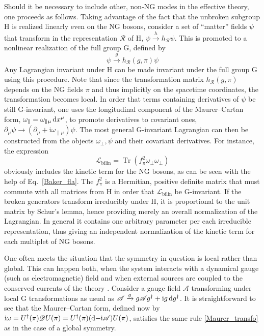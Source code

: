 \documentclass[final,2p,times,12pt,sort&compress]{elsarticle}
\newcommand\gr[1]{\mathrm{#1}}              %
\newcommand\Lag{\mathscr{L}}                %
\newcommand\DD{\mathscr{D}}                 %
\newcommand\RR{\mathscr{R}}                 %
\newcommand\AAA{\mathscr{A}}                %
\newcommand\he[1]{#1^{\dagger}}             %
\newcommand\imag{\mathrm i}                 %
\newcommand\de{\partial}
\newcommand\dd{\mathop{{\rm d}\!}\nolimits} %
\DeclareMathOperator{\Tr}{Tr}
\begin{document}
Should it be necessary to include other, non-NG modes in the effective theory,
one proceeds as follows. Taking advantage of the fact that the unbroken
subgroup $\gr H$ is realized linearly even on the NG bosons, consider a set of
``matter'' fields $\psi$ that transform in the representation $\RR$ of $\gr H$,
$\psi\xrightarrow{h}h_\RR\psi$. This is promoted to a nonlinear realization of
the full group $\gr G$, defined by
\begin{equation}
\psi\xrightarrow{g}h_\RR(g,\pi)\psi
\end{equation}
Any Lagrangian invariant under $\gr H$ can be made invariant under the full
group $\gr G$ using this procedure. Note that since the transformation matrix
$h_\RR(g,\pi)$ depends on the NG fields $\pi$ and thus implicitly on the
spacetime coordinates, the transformation becomes local. In order that terms
containing derivatives of $\psi$ be still $\gr G$-invariant, one uses the
longitudinal component of the Maurer--Cartan form,
$\omega_\parallel=\omega_{\parallel\mu}\dd x^\mu$, to promote derivatives to
covariant ones, $\de_\mu\psi\to(\de_\mu+\imag\omega_{\parallel\mu})\psi$. The
most general $\gr G$-invariant Lagrangian can then be constructed
\cite{Burgess:1998ku} from the objects $\omega_\perp,\psi$ and their covariant
derivatives. For instance, the expression
\begin{equation}
\Lag_{\text{bilin}}=\Tr(f_\pi^2\omega_\perp\omega_\perp)
\label{coset_kinterm}
\end{equation}
obviously includes the kinetic term for the NG bosons, as can be seen with the
help of Eq.~\eqref{Baker_fla}. The $f_\pi^2$ is a Hermitian, positive definite
matrix that must commute with all matrices from $\gr H$ in order that
$\Lag_{\text{bilin}}$ be $\gr G$-invariant. If the broken generators transform
irreducibly under $\gr H$, it is proportional to the unit matrix by Schur's
lemma, hence providing merely an overall normalization of the Lagrangian. In
general it contains one arbitrary parameter per each irreducible
representation, thus giving an independent normalization of the kinetic term for
each multiplet of NG bosons.

One often meets the situation that the symmetry in question is local rather
than global. This can happen both, when the system interacts with a dynamical
gauge (such as electromagnetic) field and when external sources are coupled to
the conserved currents of the theory \cite{Leutwyler:1993iq}. Consider a gauge
field $\AAA$ transforming under local $\gr G$ transformations as usual as
$\AAA\xrightarrow{g}g\AAA\he g+\imag g\dd\he g$. It is straightforward to see
that the Maurer--Cartan form, defined now by $\imag\omega=\he U(\pi)\DD
U(\pi)=\he U(\pi)(\dd-\imag\AAA)U(\pi)$, satisfies the same rule
\eqref{Maurer_transfo} as in the case of a global symmetry.
\end{document}
